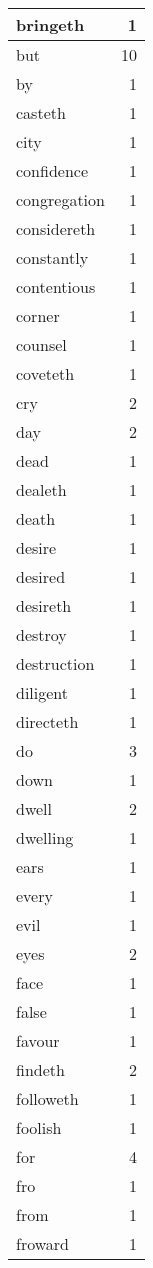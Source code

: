 \begin{center}
\begin{longtable}{l|r}
bringeth & 1\\ \hline 
but & 10\\ \hline 
by & 1\\ \hline 
casteth & 1\\ \hline 
city & 1\\ \hline 
confidence & 1\\ \hline 
congregation & 1\\ \hline 
considereth & 1\\ \hline 
constantly & 1\\ \hline 
contentious & 1\\ \hline 
corner & 1\\ \hline 
counsel & 1\\ \hline 
coveteth & 1\\ \hline 
cry & 2\\ \hline 
day & 2\\ \hline 
dead & 1\\ \hline 
dealeth & 1\\ \hline 
death & 1\\ \hline 
desire & 1\\ \hline 
desired & 1\\ \hline 
desireth & 1\\ \hline 
destroy & 1\\ \hline 
destruction & 1\\ \hline 
diligent & 1\\ \hline 
directeth & 1\\ \hline 
do & 3\\ \hline 
down & 1\\ \hline 
dwell & 2\\ \hline 
dwelling & 1\\ \hline 
ears & 1\\ \hline 
every & 1\\ \hline 
evil & 1\\ \hline 
eyes & 2\\ \hline 
face & 1\\ \hline 
false & 1\\ \hline 
favour & 1\\ \hline 
findeth & 2\\ \hline 
followeth & 1\\ \hline 
foolish & 1\\ \hline 
for & 4\\ \hline 
fro & 1\\ \hline 
from & 1\\ \hline 
froward & 1\\ \hline 

\end{longtable}
\end{center}
